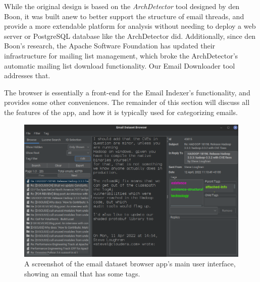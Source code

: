 \documentclass[a4paper, 12pt]{article}
\begin{document}
		While the original design is based on the \textit{ArchDetector} tool designed by den Boon\cite{denboon}, it was built anew to better support the structure of email threads, and provide a more extendable platform for analysis without needing to deploy a web server or PostgreSQL database like the ArchDetector did. Additionally, since den Boon's research, the Apache Software Foundation has updated their infrastructure for mailing list management, which broke the ArchDetector's automatic mailing list download functionality. Our Email Downloader tool addresses that.
		
		The browser is essentially a front-end for the Email Indexer's functionality, and provides some other conveniences. The remainder of this section will discuss all the features of the app, and how it is typically used for categorizing emails.
	
		\begin{figure}[H]
			\centering
			\includegraphics[width=\textwidth]{img/edb-app_populated.png}
			\caption{A screenshot of the email dataset browser app's main user interface, showing an email that has some tags.}
			\label{fig:edb-app-populated}
		\end{figure}
	
		\newpage
\end{document}
